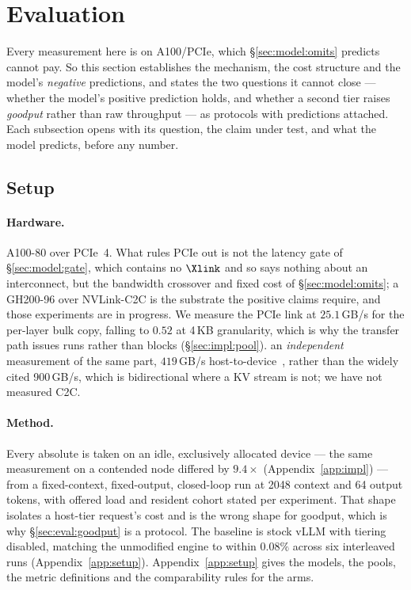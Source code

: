 \section{Evaluation}
\label{sec:eval}

Every measurement here is on A100/PCIe, which \S\ref{sec:model:omits} predicts
cannot pay. So this section establishes the mechanism, the cost structure and the
model's \emph{negative} predictions, and states the two questions it cannot close
--- whether the model's positive prediction holds, and whether a second tier
raises \emph{goodput} rather than raw throughput --- as protocols with predictions
attached. Each subsection opens with its question, the claim under test, and what
the model predicts, before any number.

\subsection{Setup}
\label{sec:eval:setup}

\paragraph{Hardware.} A100-80 over PCIe~4. What rules PCIe out is not the latency
gate of \S\ref{sec:model:gate}, which contains no $\Xlink$ and so says nothing about
an interconnect, but the bandwidth crossover and fixed cost of
\S\ref{sec:model:omits}; a GH200-96 over NVLink-C2C is the substrate the positive
claims require, and those experiments are in progress. We measure the PCIe link at
$25.1$\,GB/s for the per-layer bulk copy, falling to $0.52$ at 4\,KB granularity,
which is why the transfer path issues runs rather than blocks
(\S\ref{sec:impl:pool}).
an \emph{independent} measurement of the same part, $419$\,GB/s
host-to-device~\cite{pie}, rather than the widely cited 900\,GB/s, which is
bidirectional where a KV stream is not; we have not measured C2C.

\paragraph{Method.} Every absolute is taken on an idle, exclusively allocated device
--- the same measurement on a contended node differed by $9.4\times$
(Appendix~\ref{app:impl}) --- from a fixed-context, fixed-output, closed-loop run at
2048 context and 64 output tokens, with offered load and resident cohort stated per
experiment. That shape isolates a host-tier request's cost and is the wrong shape for
goodput, which is why \S\ref{sec:eval:goodput} is a protocol. The baseline is stock
vLLM with tiering disabled, matching the unmodified engine to within $0.08\%$ across
six interleaved runs (Appendix~\ref{app:setup}).
Appendix~\ref{app:setup} gives the models, the pools, the metric definitions and
the comparability rules for the arms.

